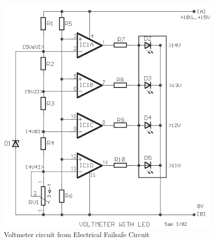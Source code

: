 \documentclass[main.tex]{subfiles}
\begin{document}
    \begin{figure}[H]
        \centering
        \includegraphics[scale = 0.5]{images/Voltmeter}
        \caption{Voltmeter circuit from Electrical Failsafe Circuit}
        \label{Voltmeter}
    \end{figure} 
    
\end{document}
